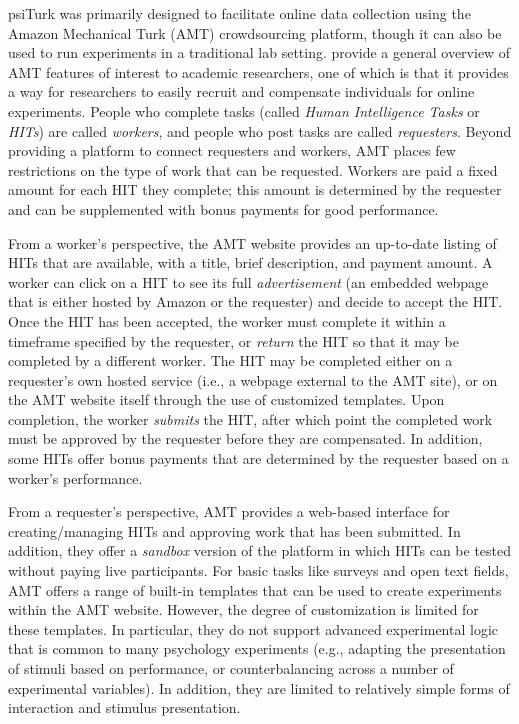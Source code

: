 \documentclass[twocolumn]{svjour3}          %
\newcommand{\psiturk}[0]{\textsf{psiTurk}}
\begin{document}
\psiturk{} was primarily designed to facilitate online data collection using
the Amazon Mechanical Turk (AMT) crowdsourcing platform, though it can also be
used to run experiments in a traditional lab setting.
\cite{Mason:2012xy} provide a general overview of AMT features of
interest to academic researchers, one of which is that it provides a way for researchers
to easily recruit and compensate individuals for online experiments.  
People who complete tasks (called \emph{Human Intelligence Tasks} or \emph{HITs}) are 
called \emph{workers}, and people who post tasks are called \emph{requesters}.
Beyond providing a platform to connect requesters and workers, AMT places few restrictions 
on the type of work that can be requested.  Workers are 
paid a fixed amount for each HIT they complete; this amount is determined by the requester and
can be supplemented with bonus payments for good performance.

From a worker's perspective, the AMT website provides an up-to-date listing of HITs that 
are available, with a title, brief description, and payment amount.  A worker can click on a HIT to 
see its full \emph{advertisement} (an embedded webpage that is either hosted by
Amazon or the requester) and decide to accept the HIT. Once the HIT has been accepted,
the worker must complete it within a timeframe specified by the requester, or \emph{return} the HIT
so that it may be completed by a different worker. The HIT may be completed either 
on a requester's own hosted service (i.e., a webpage 
external to the AMT site), or on the AMT website itself through the use of customized templates.
Upon completion, the worker \emph{submits} the HIT, after which point the completed work must 
be approved by the requester before they are compensated.
In addition, some HITs offer bonus payments that are determined by the requester based 
on a worker's performance.

From a requester's perspective, AMT provides a web-based interface for creating/managing 
HITs and approving work that has been submitted.  In addition, they offer a \emph{sandbox} version 
of the platform in which HITs can be tested without paying live participants.
For basic tasks like surveys and open text fields, AMT offers a range of built-in templates that 
can be used to create experiments within the AMT website.  However, the degree of customization 
is limited for these templates. In particular, they do not support advanced experimental logic that is 
common to many psychology experiments (e.g., adapting the presentation of stimuli based on 
performance, or counterbalancing across a number of experimental variables).
In addition, they are limited to relatively simple forms of interaction and stimulus presentation.
\end{document}
